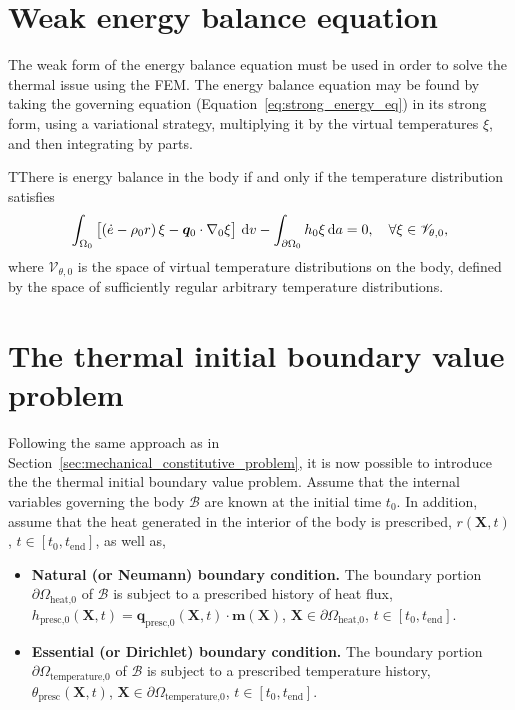 \section{Weak energy balance equation}

The weak form of the energy balance equation must be used in order to solve the thermal issue using the FEM.
The energy balance equation may be found by taking the governing equation (Equation~\eqref{eq:strong_energy_eq}) in its strong form, using a variational strategy, multiplying it by the virtual temperatures \(\xi\), and then integrating by parts.
\begin{problem}
TThere is energy balance in the body if and only if the temperature distribution satisfies
    \begin{equation}
        \int_{\Omega_0}   \left[\left(\dot e - \rho_0 r\right) \xi - \bm q_0\cdot \nabla_0 \xi\right]\,\mathrm{d} v - \int_{\partial\Omega_0} h_0 \xi\,\mathrm{d} a = 0,\quad \forall \xi \in \mathscr{V}_{\theta,0},
    \end{equation}
 where $\mathscr{V}_{\theta,0}$ is the space of virtual temperature distributions on the body, defined by the space of sufficiently regular arbitrary temperature distributions.
 \end{problem}

\section{The thermal initial boundary value problem}

Following the same approach as in Section~\ref{sec:mechanical_constitutive_problem}, it is now possible to introduce the the thermal initial boundary value problem.
Assume that the internal variables governing the body \(\mathcal B\) are known at the initial time \(t_0\).
In addition, assume that the heat generated in the interior of the body is prescribed, \(r(\bm X, t)\), \(t\in[t_0, t_\text{end}]\), as well as,
\begin{itemize}
  \item \textbf{Natural (or Neumann) boundary condition.} The boundary portion \(\partial \Omega_\text{heat,0}\) of \(\mathcal B\) is subject to a prescribed history of heat flux, \(h_\text{presc,0}(\bm X, t) = \bm q_\text{presc,0}(\bm X, t)\cdot \bm m(\bm X)\), \(\bm X \in \partial \Omega_\text{heat,0}\), \(t\in [t_0,t_\text{end}]\).
  \item \textbf{Essential (or Dirichlet) boundary condition.} The boundary portion \(\partial \Omega_\text{temperature,0}\) of \(\mathcal B\) is subject to a prescribed temperature history, \(\theta_\text{presc}(\bm X, t)\), \(\bm X \in \partial \Omega_\text{temperature,0}\), \(t\in [t_0,t_\text{end}]\).
\end{itemize}

